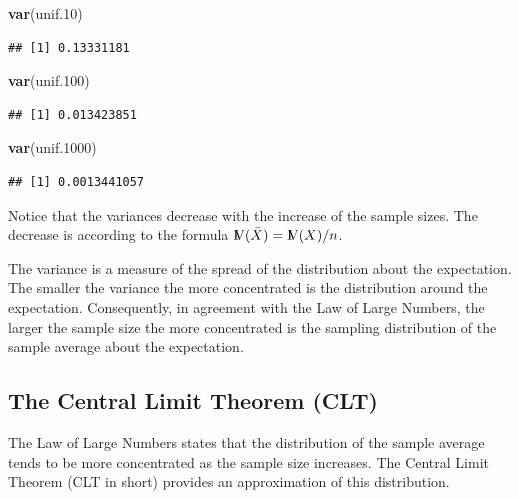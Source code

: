 \documentclass[]{krantz}
\makeatletter
\newenvironment{Shaded}{\begin{snugshade}}{\end{snugshade}}
\newcommand{\FloatTok}[1]{\textcolor[rgb]{0.00,0.00,0.81}{#1}}
\newcommand{\KeywordTok}[1]{\textcolor[rgb]{0.13,0.29,0.53}{\textbf{#1}}}
\newcommand{\NormalTok}[1]{#1}
\newcommand{\Var}{{\rm I\kern-.3em V}}
\newenvironment{kframe}{%
\medskip{}
\setlength{\fboxsep}{.8em}
 \def\at@end@of@kframe{}%
 \ifinner\ifhmode%
  \def\at@end@of@kframe{\end{minipage}}%
  \begin{minipage}{\columnwidth}%
 \fi\fi%
 \def\FrameCommand##1{\hskip\@totalleftmargin \hskip-\fboxsep
 \colorbox{shadecolor}{##1}\hskip-\fboxsep
     \hskip-\linewidth \hskip-\@totalleftmargin \hskip\columnwidth}%
 \MakeFramed {\advance\hsize-\width
   \@totalleftmargin\z@ \linewidth\hsize
   \@setminipage}}%
 {\par\unskip\endMakeFramed%
 \at@end@of@kframe}
\renewenvironment{Shaded}{\begin{kframe}}{\end{kframe}}
\theoremstyle{definition}
\theoremstyle{definition}
\theoremstyle{definition}
\theoremstyle{remark}
\makeatother
\begin{document}
\begin{Shaded}
\begin{Highlighting}[]
\KeywordTok{var}\NormalTok{(unif}\FloatTok{.10}\NormalTok{)}
\end{Highlighting}
\end{Shaded}

\begin{verbatim}
## [1] 0.13331181
\end{verbatim}

\begin{Shaded}
\begin{Highlighting}[]
\KeywordTok{var}\NormalTok{(unif}\FloatTok{.100}\NormalTok{)}
\end{Highlighting}
\end{Shaded}

\begin{verbatim}
## [1] 0.013423851
\end{verbatim}

\begin{Shaded}
\begin{Highlighting}[]
\KeywordTok{var}\NormalTok{(unif}\FloatTok{.1000}\NormalTok{)}
\end{Highlighting}
\end{Shaded}

\begin{verbatim}
## [1] 0.0013441057
\end{verbatim}

Notice that the variances decrease with the increase of the sample
sizes. The decrease is according to the formula
\(\Var(\bar X) = \Var(X)/n\).

The variance is a measure of the spread of the distribution about the
expectation. The smaller the variance the more concentrated is the
distribution around the expectation. Consequently, in agreement with the
Law of Large Numbers, the larger the sample size the more concentrated
is the sampling distribution of the sample average about the
expectation.

\hypertarget{the-central-limit-theorem-clt}{%
\subsection{The Central Limit Theorem (CLT)}\label{the-central-limit-theorem-clt}}

The Law of Large Numbers states that the distribution of the sample
average tends to be more concentrated as the sample size increases. The
Central Limit Theorem (CLT in short) provides an approximation of this
distribution.
\end{document}
